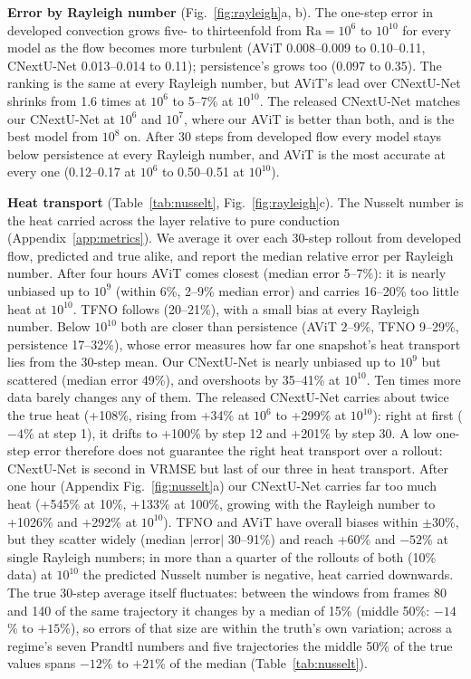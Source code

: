 \documentclass[11pt]{article}
\begin{document}
\textbf{Error by Rayleigh number} (Fig.~\ref{fig:rayleigh}a, b). The one-step error in developed convection grows
five- to thirteenfold from $\mathrm{Ra}=10^6$ to $10^{10}$ for every model as the flow becomes more turbulent (AViT
0.008--0.009 to 0.10--0.11, CNextU-Net 0.013--0.014 to 0.11); persistence's grows too (0.097 to 0.35). The ranking is
the same at every Rayleigh number, but AViT's lead over CNextU-Net shrinks from 1.6 times at $10^6$ to 5--7\% at
$10^{10}$. The released CNextU-Net matches our CNextU-Net at $10^6$ and $10^7$, where our AViT is better than both,
and is the best model from $10^8$ on. After 30 steps from developed flow every model stays below persistence at every
Rayleigh number, and AViT is the most accurate at every one (0.12--0.17 at $10^6$ to 0.50--0.51 at $10^{10}$).

\textbf{Heat transport} (Table~\ref{tab:nusselt}, Fig.~\ref{fig:rayleigh}c). The Nusselt number is the heat carried
across the layer relative to pure conduction (Appendix~\ref{app:metrics}). We average it over each 30-step rollout
from developed flow, predicted and true alike, and report the median relative error per Rayleigh number. After four
hours AViT comes closest (median error 5--7\%): it is nearly unbiased up to $10^9$ (within 6\%, 2--9\% median error)
and carries 16--20\% too little heat at $10^{10}$. TFNO follows (20--21\%), with a small bias at every Rayleigh
number. Below $10^{10}$ both are closer than persistence (AViT 2--9\%, TFNO 9--29\%, persistence 17--32\%), whose error
measures how far one snapshot's heat transport lies from the 30-step mean. Our CNextU-Net is nearly unbiased up to
$10^9$ but scattered (median error 49\%), and overshoots by 35--41\% at $10^{10}$. Ten times more data barely changes
any of them. The released CNextU-Net carries about twice the true heat (+108\%, rising from +34\% at $10^6$ to +299\%
at $10^{10}$): right at first ($-4$\% at step 1), it drifts to +100\% by step 12 and +201\% by step 30. A low
one-step error therefore does not guarantee the right heat transport over a rollout: CNextU-Net is second in VRMSE but
last of our three in heat transport. After one hour (Appendix Fig.~\ref{fig:nusselt}a) our CNextU-Net carries far too
much heat (+545\% at 10\%, +133\% at 100\%, growing with the Rayleigh number to +1026\% and +292\% at $10^{10}$). TFNO
and AViT have overall biases within $\pm30$\%, but they scatter widely (median $|$error$|$ 30--91\%) and reach +60\%
and $-52$\% at single Rayleigh numbers; in more than a quarter of the rollouts of both (10\% data) at $10^{10}$ the
predicted Nusselt number is negative, heat carried downwards. The true 30-step average itself fluctuates: between the windows
from frames 80 and 140 of the same trajectory it changes by a median of 15\% (middle 50\%: $-14$\% to $+15$\%), so
errors of that size are within the truth's own variation; across a regime's seven Prandtl numbers and five
trajectories the middle 50\% of the true values spans $-12$\% to $+21$\% of the median (Table~\ref{tab:nusselt}).
\end{document}
